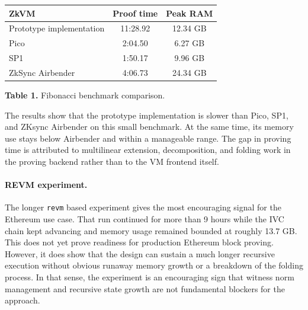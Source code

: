 \documentclass[10pt,a4paper]{article}
\begin{document}
\begin{center}
	\footnotesize
	\begin{tabular}{|l|c|c|}
		\hline
		\textbf{ZkVM}            & \textbf{Proof time} & \textbf{Peak RAM} \\
		\hline
		Prototype implementation & 11:28.92            & 12.34 GB          \\
		Pico                     & 2:04.50             & 6.27 GB           \\
		SP1                      & 1:50.17             & 9.96 GB           \\
		ZkSync Airbender         & 4:06.73             & 24.34 GB          \\
		\hline
	\end{tabular}

	\smallskip
	\textbf{Table 1.} Fibonacci benchmark comparison.
\end{center}

The results show that the prototype implementation is slower than Pico,
SP1, and ZKsync Airbender on this small benchmark. At the same time, its
memory use stays below Airbender and within a manageable range. The gap in
proving time is attributed to multilinear extension, decomposition, and
folding work in the proving backend rather than to the VM frontend itself.

\paragraph{REVM experiment.} The longer \texttt{revm} based experiment
gives the most encouraging signal for the Ethereum use case. That run
continued for more than 9 hours while the IVC chain kept advancing and memory
usage remained bounded at roughly 13.7 GB. This does not yet prove readiness
for production Ethereum block proving. However, it does show that the design
can sustain a much longer recursive execution without obvious runaway memory
growth or a breakdown of the folding process. In that sense, the experiment is
an encouraging sign that witness norm management and recursive state growth are
not fundamental blockers for the approach.
\end{document}
